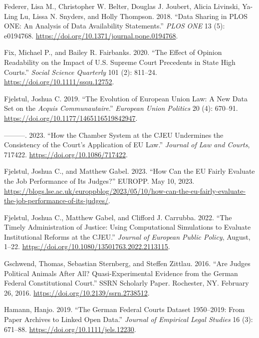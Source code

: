 \documentclass[
  11pt,
]{article}
\newlength{\cslhangindent}
\newenvironment{CSLReferences}[2] %
 {\begin{list}{}{%
  \setlength{\itemindent}{0pt}
  \setlength{\leftmargin}{0pt}
  \setlength{\parsep}{0pt}
  \ifodd #1
   \setlength{\leftmargin}{\cslhangindent}
   \setlength{\itemindent}{-1\cslhangindent}
  \fi
  \setlength{\itemsep}{#2\baselineskip}}}
 {\end{list}}
\begin{document}
\begin{CSLReferences}{1}{0}
Federer, Lisa M., Christopher W. Belter, Douglas J. Joubert, Alicia Livinski, Ya-Ling Lu, Lissa N. Snyders, and Holly Thompson. 2018. {``Data Sharing in {PLOS ONE}: {An} Analysis of {Data Availability Statements}.''} \emph{PLOS ONE} 13 (5): e0194768. \url{https://doi.org/10.1371/journal.pone.0194768}.

Fix, Michael P., and Bailey R. Fairbanks. 2020. {``The {Effect} of {Opinion Readability} on the {Impact} of {U}.{S}. {Supreme Court Precedents} in {State High Courts}.''} \emph{Social Science Quarterly} 101 (2): 811--24. \url{https://doi.org/10.1111/ssqu.12752}.

Fjelstul, Joshua C. 2019. {``The Evolution of {European Union} Law: {A} New Data Set on the {\emph{Acquis Communautaire}}.''} \emph{European Union Politics} 20 (4): 670--91. \url{https://doi.org/10.1177/1465116519842947}.

---------. 2023. {``How the {Chamber System} at the {CJEU Undermines} the {Consistency} of the {Court}'s {Application} of {EU Law}.''} \emph{Journal of Law and Courts}, 717422. \url{https://doi.org/10.1086/717422}.

Fjelstul, Joshua C., and Matthew Gabel. 2023. {``How Can the EU Fairly Evaluate the Job Performance of Its Judges?''} EUROPP. May 10, 2023. \url{https://blogs.lse.ac.uk/europpblog/2023/05/10/how-can-the-eu-fairly-evaluate-the-job-performance-of-its-judges/}.

Fjelstul, Joshua C., Matthew Gabel, and Clifford J. Carrubba. 2022. {``The Timely Administration of Justice: Using Computational Simulations to Evaluate Institutional Reforms at the {CJEU}.''} \emph{Journal of European Public Policy}, August, 1--22. \url{https://doi.org/10.1080/13501763.2022.2113115}.

Gschwend, Thomas, Sebastian Sternberg, and Steffen Zittlau. 2016. {``Are {Judges Political Animals} After {All}? {Quasi-Experimental Evidence} from the {German Federal Constitutional Court}.''} SSRN Scholarly Paper. Rochester, NY. February 26, 2016. \url{https://doi.org/10.2139/ssrn.2738512}.

Hamann, Hanjo. 2019. {``The {German Federal Courts Dataset} 1950--2019: {From Paper Archives} to {Linked Open Data}.''} \emph{Journal of Empirical Legal Studies} 16 (3): 671--88. \url{https://doi.org/10.1111/jels.12230}.


\end{CSLReferences}
\end{document}
